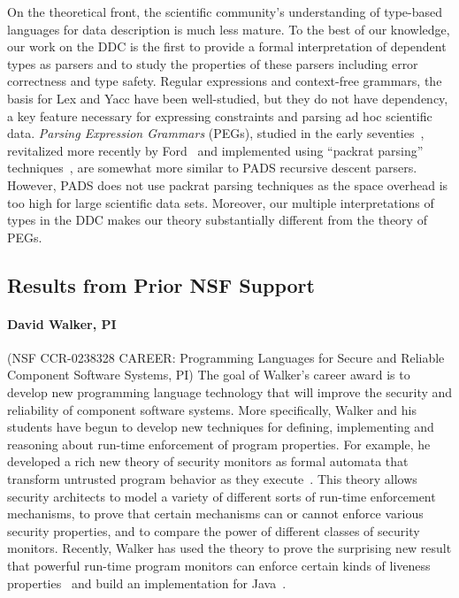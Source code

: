 \documentclass[11pt]{article}
\begin{document}
On the theoretical front, the scientific community's understanding of type-based languages for data description
is much less mature.  To the best of our knowledge, our work on
the DDC is the first to provide a formal interpretation of dependent 
types as parsers and to study the properties of these parsers including error correctness and
type safety.  Regular expressions and context-free grammars, the basis for Lex and Yacc
have been well-studied, but they do not have dependency, a key feature necessary for expressing
constraints and parsing ad hoc scientific data.
{\em Parsing Expression Grammars} (PEGs),
studied in the early seventies~\cite{birman+:parsing}, revitalized more 
recently by Ford~\cite{ford:pegs} and implemented using
``packrat parsing'' techniques~\cite{ford:packrat,grimm:packrat}, 
are somewhat more similar to PADS recursive descent parsers. However, PADS does
not use packrat parsing techniques as the space overhead is too high for
large scientific data sets.  Moreover, our multiple interpretations of types in the DDC
makes our theory substantially different from the theory of PEGs.

%

\subsection{Results from Prior NSF Support}
\label{ssec:results}

\paragraph*{David Walker, PI} (NSF CCR-0238328 CAREER: Programming Languages for Secure and Reliable Component Software
Systems, PI)
The goal of Walker's career award is to develop new programming language
technology that will improve the security and reliability of component software systems.
More specifically, Walker and his students have begun to develop new techniques for defining,
implementing and reasoning about run-time enforcement of program properties.
For example, he developed a rich new theory of security monitors as formal
automata that transform untrusted program behavior as they 
execute~\cite{ligatti+:edit-automata}.
This theory allows security
architects to model a variety of different sorts of run-time
enforcement mechanisms, to prove that certain mechanisms can or cannot
enforce various security properties, and to compare the power of
different classes of security monitors.    Recently, Walker 
has used the theory to prove the surprising new result that powerful run-time
program monitors can enforce certain kinds of liveness properties~\cite{ligatti+:renewal}
and build an implementation for Java~\cite{bauer+:polymer}.
\end{document}

